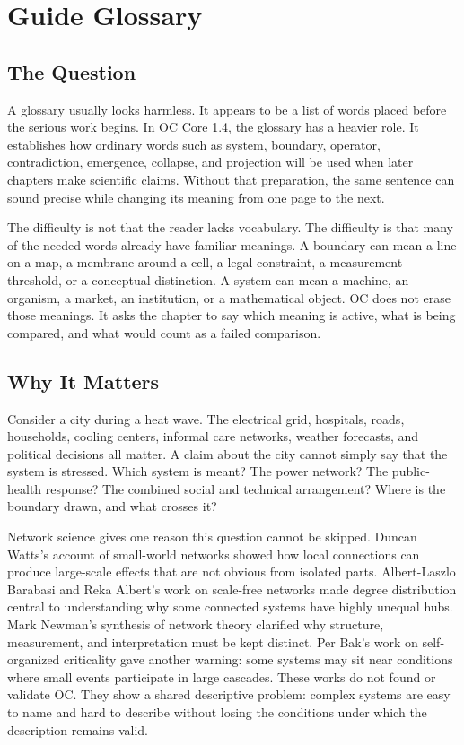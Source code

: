 \documentclass[11pt,a4paper,openany]{book}
\begin{document}
\section{Guide Glossary}
\subsection{The Question}
A glossary usually looks harmless. It appears to be a list of words placed before the serious work begins. In OC Core 1.4, the glossary has a heavier role. It establishes how ordinary words such as system, boundary, operator, contradiction, emergence, collapse, and projection will be used when later chapters make scientific claims. Without that preparation, the same sentence can sound precise while changing its meaning from one page to the next. \cite{raf_networks,bak_soc}\par
The difficulty is not that the reader lacks vocabulary. The difficulty is that many of the needed words already have familiar meanings. A boundary can mean a line on a map, a membrane around a cell, a legal constraint, a measurement threshold, or a conceptual distinction. A system can mean a machine, an organism, a market, an institution, or a mathematical object. OC does not erase those meanings. It asks the chapter to say which meaning is active, what is being compared, and what would count as a failed comparison.\par
\subsection{Why It Matters}
Consider a city during a heat wave. The electrical grid, hospitals, roads, households, cooling centers, informal care networks, weather forecasts, and political decisions all matter. A claim about the city cannot simply say that the system is stressed. Which system is meant? The power network? The public-health response? The combined social and technical arrangement? Where is the boundary drawn, and what crosses it? \cite{raf_networks,bak_soc}\par
Network science gives one reason this question cannot be skipped. Duncan Watts's account of small-world networks showed how local connections can produce large-scale effects that are not obvious from isolated parts. Albert-Laszlo Barabasi and Reka Albert's work on scale-free networks made degree distribution central to understanding why some connected systems have highly unequal hubs. Mark Newman's synthesis of network theory clarified why structure, measurement, and interpretation must be kept distinct. Per Bak's work on self-organized criticality gave another warning: some systems may sit near conditions where small events participate in large cascades. These works do not found or validate OC. They show a shared descriptive problem: complex systems are easy to name and hard to describe without losing the conditions under which the description remains valid.\par
\end{document}
